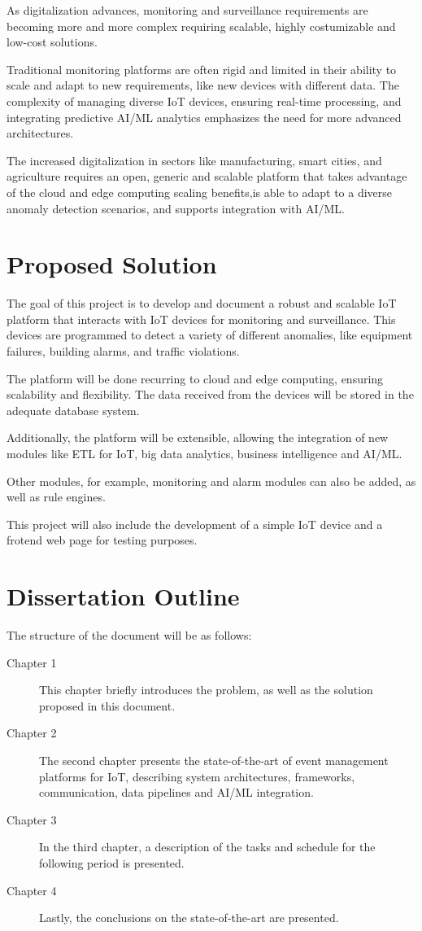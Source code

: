 As digitalization advances, monitoring and surveillance requirements are
becoming more and more complex requiring scalable, highly costumizable and
low-cost solutions.

Traditional monitoring platforms are often rigid and limited in their ability
to scale and adapt to new requirements, like new devices with different data.
The complexity of managing diverse \gls{IoT} devices, ensuring real-time processing,
and integrating predictive \gls{AI}/\gls{ML} analytics emphasizes the need for
more advanced architectures.

The increased digitalization in sectors like manufacturing, smart cities,
and agriculture requires an open, generic and scalable platform that takes
advantage of the cloud and edge computing scaling benefits,is able to
adapt to a diverse anomaly detection scenarios, and supports integration with
\gls{AI}/\gls{ML}.
\section{Proposed Solution}

The goal of this project is to develop and document a robust and scalable
\gls{IoT} platform that interacts with \gls{IoT} devices for monitoring and
surveillance. This devices are programmed to detect a variety of different
anomalies, like equipment failures, building alarms, and traffic violations.

The platform will be done recurring to cloud and edge computing, ensuring
scalability and flexibility. The data received from the devices will be stored
in the adequate database system.

Additionally, the platform will be extensible, allowing the integration of new
modules like \gls{ETL} for \gls{IoT}, big data analytics, business intelligence
and \gls{AI}/\gls{ML}.

Other modules, for example, monitoring and alarm modules can also be added, as
well as rule engines.

This project will also include the development of a simple IoT device and a
frotend web page for testing purposes.

\section{Dissertation Outline}
The structure of the document will be as follows:

\begin{description}
	\item[Chapter 1 ] This chapter briefly introduces the problem, as well as the
	      solution proposed in this document.
	\item[Chapter 2 ] The second chapter presents the state-of-the-art of event
	      management platforms for IoT, describing system architectures, frameworks,
	      communication, data pipelines and \gls{AI}/\gls{ML} integration.
	\item[Chapter 3 ] In the third chapter, a description of the tasks and
	      schedule for the following period is presented.
	\item[Chapter 4 ] Lastly, the conclusions on the state-of-the-art are presented.
\end{description}
